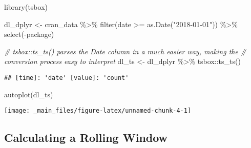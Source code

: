 \documentclass[
]{book}
\newenvironment{Shaded}{\begin{snugshade}}{\end{snugshade}}
\newcommand{\CommentTok}[1]{\textcolor[rgb]{0.56,0.35,0.01}{\textit{#1}}}
\newcommand{\FunctionTok}[1]{\textcolor[rgb]{0.00,0.00,0.00}{#1}}
\newcommand{\NormalTok}[1]{#1}
\newcommand{\OtherTok}[1]{\textcolor[rgb]{0.56,0.35,0.01}{#1}}
\newcommand{\SpecialCharTok}[1]{\textcolor[rgb]{0.00,0.00,0.00}{#1}}
\newcommand{\StringTok}[1]{\textcolor[rgb]{0.31,0.60,0.02}{#1}}
\begin{document}
\begin{Shaded}
\begin{Highlighting}[]
\FunctionTok{library}\NormalTok{(tsbox)}

\NormalTok{dl\_dplyr }\OtherTok{\textless{}{-}}\NormalTok{ cran\_data }\SpecialCharTok{\%\textgreater{}\%}
  \FunctionTok{filter}\NormalTok{(date }\SpecialCharTok{\textgreater{}=} \FunctionTok{as.Date}\NormalTok{(}\StringTok{"2018{-}01{-}01"}\NormalTok{)) }\SpecialCharTok{\%\textgreater{}\%} 
  \FunctionTok{select}\NormalTok{(}\SpecialCharTok{{-}}\NormalTok{package)}

\CommentTok{\# tsbox::ts\_ts() parses the Date column in a much easier way, making the}
\CommentTok{\# conversion process easy to interpret}
\NormalTok{dl\_ts }\OtherTok{\textless{}{-}}\NormalTok{ dl\_dplyr }\SpecialCharTok{\%\textgreater{}\%}
\NormalTok{  tsbox}\SpecialCharTok{::}\FunctionTok{ts\_ts}\NormalTok{()}
\end{Highlighting}
\end{Shaded}

\begin{verbatim}
## [time]: 'date' [value]: 'count'
\end{verbatim}

\begin{Shaded}
\begin{Highlighting}[]
\FunctionTok{autoplot}\NormalTok{(dl\_ts)}
\end{Highlighting}
\end{Shaded}

\begin{center}\texttt{[image: \_main\_files/figure-latex/unnamed-chunk-4-1]} \end{center}

\hypertarget{calculating-a-rolling-window}{%
\subsection{Calculating a Rolling Window}\label{calculating-a-rolling-window}}
\end{document}
